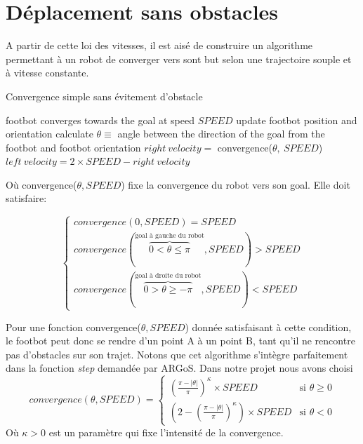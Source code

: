 \section{Déplacement sans obstacles}

A partir de cette loi des vitesses, il est aisé de construire un algorithme permettant à un robot de converger vers sont but selon une trajectoire souple et à vitesse constante.

\begin{algorithm}
\caption{Convergence simple sans évitement d'obstacle}
\label{simpleConvergence}
\begin{algorithmic}
  \ENSURE footbot converges towards the goal at speed \(SPEED\)
    \STATE update footbot position and orientation
    \STATE calculate \( \theta \equiv\) angle between the direction of the goal from the footbot and footbot orientation
    \STATE \( right\:velocity = \) convergence(\(\theta,\:SPEED\))
    \STATE \( left\:velocity = 2 \times SPEED-right\:velocity\) 
  \ENDWHILE
\end{algorithmic}
\end{algorithm}

Où convergence($\theta, SPEED$) fixe la convergence du robot vers son goal. Elle doit satisfaire:

\begin{equation}
  \begin{cases}
    convergence(0,SPEED)=SPEED\\
    convergence(\overset{\text{goal à gauche du robot}}{\overbrace{0<\theta\leq\pi}},SPEED)>SPEED\\
    convergence(\overset{\text{goal à droite du robot}}{\overbrace{0>\theta\geq-\pi}},SPEED)<SPEED
  \end{cases}
\end{equation}

Pour une fonction convergence($\theta, SPEED$) donnée satisfaisant à cette condition, le footbot peut donc se rendre d'un point A à un point B, tant qu'il ne rencontre pas d'obstacles sur son trajet. Notons que cet algorithme s'intègre parfaitement dans la fonction \emph{step} demandée par ARGoS. Dans notre projet nous avons choisi
\[
convergence(\theta, SPEED)=
\begin{cases}
      { \left( \frac{\pi- \lvert \theta \rvert }{\pi} \right)}^{\kappa} \times SPEED & \text{si } \theta \geq 0\\
      \left( 2 - { \left( \frac{\pi- \lvert \theta \rvert }{\pi} \right) }^{\kappa} \right) \times SPEED & \text{si } \theta < 0
\end{cases}
\]
Où $\kappa > 0$ est un paramètre qui fixe l'intensité de la convergence.

